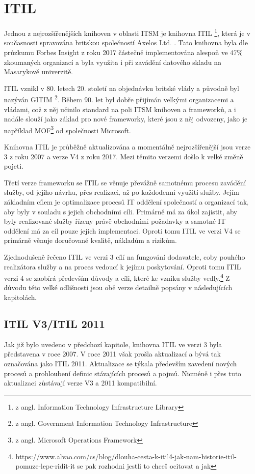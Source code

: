 \documentclass[
  digital,     %
  twoside,     %
  lof,         %
  lot,         %
]{fithesis4}
\begin{document}
\section{ITIL}
Jednou z nejrozšířenějších knihoven v oblasti ITSM je knihovna ITIL \footnote{z angl. Information Technology Infrastructure Library}, která je v současnosti spravována britskou společností Axelos Ltd. \parencite[s.~31]{Matula2017}. Tato knihovna byla dle průzkumu Forbes Insight z roku 2017 částečně implementována alespoň ve 47\% zkoumaných organizací\parencite{Watts3082017} a byla využita i při  zavádění datového skladu na Masarykově univerzitě. 

ITIL vznikl v 80. letech 20. století na objednávku britské vlády a původně byl nazýván GITIM \footnote{z angl. Government Information Technology Infrastructure}. Během 90. let byl dobře přijímán velkými organizacemi a vládami, což z něj učinilo standard na poli ITSM knihoven a frameworků, a i nadále slouží jako základ pro nové frameworky, které jsou z něj odvozeny, jako je například MOF\footnote{z angl. Microsoft Operations Framework} od společnosti Microsoft. \parencite[s. ~31]{Matula2017}

Knihovna ITIL je průběžně aktualizována a momentálně nejrozšířenější jsou verze 3 z roku 2007 a verze V4 z roku 2017. Mezi těmito verzemi došlo k velké změně pojetí. 

Třetí verze frameworku se ITIL se věnuje převážně samotnému procesu zavádění služby, od jejího návrhu, přes realizaci, až po každodenní využití služby. Jejím základním cílem je optimalizace procesů IT oddělení společností a organizací tak, aby byly v souladu s jejich obchodními cíli. Primárně má za úkol zajistit, aby byly realizované služby řízeny právě obchodními požadavky a samotné IT oddělení má za cíl pouze jejich implementaci.\parencite[s.~8]{Carlidge2007} Oproti tomu ITIL ve verzi V4 se primárně věnuje doručované kvalitě, nákladům a rizikům. 

Zjednodušeně řečeno ITIL ve verzi 3 cílí na fungování dodavatele, coby pouhého realizátora služby a na proces vedoucí k jejímu poskytování. Oproti tomu ITIL verzi 4 se zaobírá především důvody a cíli, které ke vzniku služby vedly.\footnote{https://www.alvao.com/cs/blog/dlouha-cesta-k-itil4-jak-nam-historie-itil-pomuze-lepe-ridit-it se pak rozhodni jestli to chceš ocitovat a jak}
Z důvodu této velké  odlišnosti jsou obě verze detailně popsány v následujících kapitolách.  
\subsection{ITIL V3/ITIL 2011}
Jak již bylo uvedeno v předchozí kapitole, knihovna ITIL ve verzi 3 byla představena v roce 2007. V roce 2011 však prošla aktualizací a bývá tak označována jako ITIL 2011. Aktualizace se týkala především zavedení nových procesů a prohloubení definic stávajících procesů a pojmů. Nicméně i přes tuto aktualizaci zůstávají verze V3 a 2011 kompatibilní.\parencite{Kempter2722013}
\end{document}
